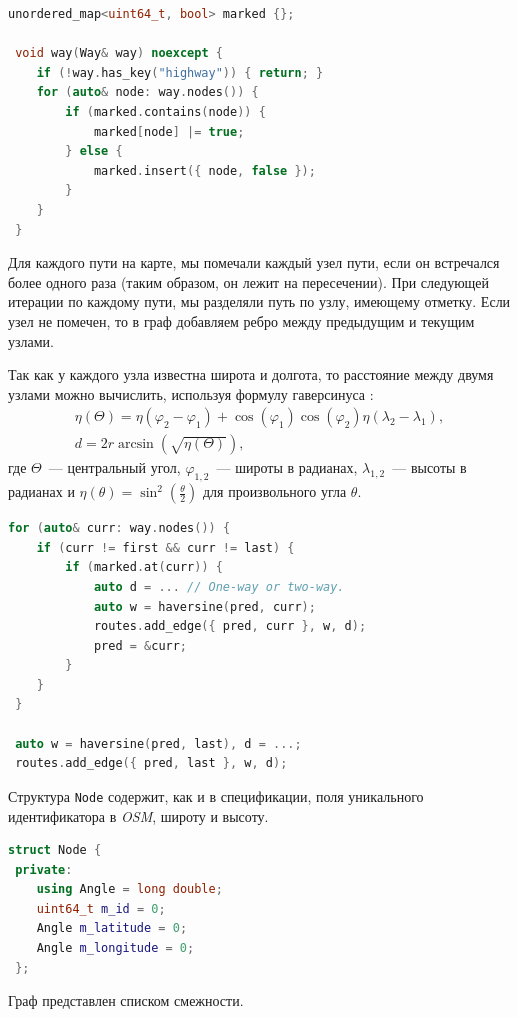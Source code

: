 \documentclass[11pt]{article}
\begin{document}
	\begin{lstlisting}[language=C++]
 unordered_map<uint64_t, bool> marked {};
 
 void way(Way& way) noexcept {
	if (!way.has_key("highway")) { return; }
	for (auto& node: way.nodes()) {
		if (marked.contains(node)) {
			marked[node] |= true;
		} else {
			marked.insert({ node, false });
		}
	}
 }
	\end{lstlisting}
	
	Для каждого пути на карте, мы помечали каждый узел пути, если он встречался более одного раза (таким образом, он лежит на пересечении).
	При следующей итерации по каждому пути, мы разделяли путь по узлу, имеющему отметку.
	Если узел не помечен, то в граф добавляем ребро между предыдущим и текущим узлами.
	
	Так как у каждого узла известна широта и долгота, то расстояние между двумя узлами можно вычислить, используя формулу гаверсинуса \cite{haversine}:
\begin{gather*}
	\eta(\Theta) = \eta(\varphi_2 - \varphi_1) + \cos(\varphi_1) \cos(\varphi_2) \eta(\lambda_2 - \lambda_1), \\
	d = 2r \arcsin(\sqrt{\eta(\Theta)}),
\end{gather*}
	где $ \Theta $~--- центральный угол, $ \varphi_{1,2} $~--- широты в радианах, $ \lambda_{1,2} $~--- высоты в радианах и $ \eta(\theta) = \sin^2 \left(\frac{\theta}{2}\right) $ для произвольного угла $ \theta $.
	
	\begin{lstlisting}[language=C++]
 for (auto& curr: way.nodes()) {
	if (curr != first && curr != last) {
     	if (marked.at(curr)) {
     		auto d = ... // One-way or two-way.
			auto w = haversine(pred, curr);
			routes.add_edge({ pred, curr }, w, d);
			pred = &curr;
		}
	}
 }

 auto w = haversine(pred, last), d = ...;
 routes.add_edge({ pred, last }, w, d);
 	\end{lstlisting}
 	
	Структура \texttt{Node} содержит, как и в спецификации, поля уникального идентификатора в \textit{OSM}, широту и высоту.
 	
	\begin{lstlisting}[language=C++]
 struct Node {
 private:
	using Angle = long double; 
	uint64_t m_id = 0;
	Angle m_latitude = 0;
	Angle m_longitude = 0;
 };
	\end{lstlisting} 	
 	
 	Граф представлен списком смежности.
 	
\end{document}
